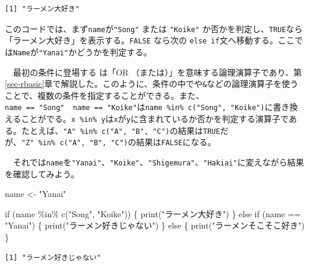 \documentclass[
  a4paper,
  pandoc,
  ja=standard,
  jafont=haranoaji]{bxjsbook}
\newenvironment{Shaded}{\begin{snugshade}}{\end{snugshade}}
\newcommand{\ControlFlowTok}[1]{\textcolor[rgb]{0.00,0.48,0.65}{#1}}
\newcommand{\FunctionTok}[1]{\textcolor[rgb]{0.28,0.35,0.67}{#1}}
\newcommand{\NormalTok}[1]{\textcolor[rgb]{0.00,0.48,0.65}{#1}}
\newcommand{\OtherTok}[1]{\textcolor[rgb]{0.00,0.48,0.65}{#1}}
\newcommand{\SpecialCharTok}[1]{\textcolor[rgb]{0.37,0.37,0.37}{#1}}
\newcommand{\StringTok}[1]{\textcolor[rgb]{0.13,0.47,0.30}{#1}}
\begin{document}
\begin{verbatim}
[1] "ラーメン大好き"
\end{verbatim}

このコードでは、まず\texttt{name}が\texttt{"Song"} または
\texttt{"Koike"}
か否かを判定し、\texttt{TRUE}なら「ラーメン大好き」を表示する。\texttt{FALSE}
なら次の
\texttt{else\ if}文へ移動する。ここでは\texttt{Name}が\texttt{"Yanai"}かどうかを判定する。

　最初の条件に登場する \texttt{\textbar{}}は「OR
（または）」を意味する論理演算子であり、第\ref{sec-rbasic}章で解説した。このように、条件の中で\texttt{\textbar{}}や\texttt{\&}などの論理演算子を使うことで、複数の条件を指定することができる。また、\texttt{name\ ==\ "Song"\ \textbar{}\ name\ ==\ "Koike"}は\texttt{name\ \%in\%\ c("Song",\ "Koike")}に書き換えることがでる。\texttt{x\ \%in\%\ y}は\texttt{x}が\texttt{y}に含まれているか否かを判定する演算子である。たとえば、\texttt{"A"\ \%in\%\ c("A",\ "B",\ "C")}の結果は\texttt{TRUE}だが、\texttt{"Z"\ \%in\%\ c("A",\ "B",\ "C")}の結果は\texttt{FALSE}になる。

　それでは\texttt{name}を\texttt{"Yanai"}、\texttt{"Koike"}、\texttt{"Shigemura"}、\texttt{"Hakiai"}に変えながら結果を確認してみよう。

\begin{Shaded}
\begin{Highlighting}[numbers=left,,]
\NormalTok{name }\OtherTok{\textless{}{-}} \StringTok{"Yanai"}

\ControlFlowTok{if}\NormalTok{ (name }\SpecialCharTok{\%in\%} \FunctionTok{c}\NormalTok{(}\StringTok{"Song"}\NormalTok{, }\StringTok{"Koike"}\NormalTok{)) \{}
  \FunctionTok{print}\NormalTok{(}\StringTok{"ラーメン大好き"}\NormalTok{)}
\NormalTok{\} }\ControlFlowTok{else} \ControlFlowTok{if}\NormalTok{ (name }\SpecialCharTok{==} \StringTok{"Yanai"}\NormalTok{) \{}
  \FunctionTok{print}\NormalTok{(}\StringTok{"ラーメン好きじゃない"}\NormalTok{)}
\NormalTok{\} }\ControlFlowTok{else}\NormalTok{ \{}
  \FunctionTok{print}\NormalTok{(}\StringTok{"ラーメンそこそこ好き"}\NormalTok{)}
\NormalTok{\}}
\end{Highlighting}
\end{Shaded}

\begin{verbatim}
[1] "ラーメン好きじゃない"
\end{verbatim}
\end{document}

